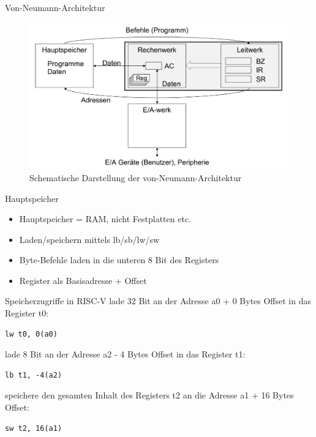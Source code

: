 \documentclass[
  german,            %
  aspectratio=169,    %
]{tumbeamer}
\begin{document}
\begin{frame}[c]{Von-Neumann-Architektur}{}
  \begin{figure}[h]
    \includegraphics[height=0.75\textheight]{resources/w03_von_Neumann.png}
    \caption{Schematische Darstellung der von-Neumann-Architektur}
  \end{figure}
\end{frame}

\begin{frame}[fragile, c]{Hauptspeicher}{}
  \begin{itemize}
    \item Hauptspeicher = RAM, nicht Festplatten etc.
    \item Laden/speichern mittels lb/sb/lw/sw
    \item Byte-Befehle laden in die unteren 8 Bit des Registers
    \item Register als Basisadresse + Offset
  \end{itemize}  
\end{frame}

\begin{frame}[fragile, c]{Speicherzugriffe in RISC-V}{}
  lade 32 Bit an der Adresse a0 + 0 Bytes Offset in das Register t0: 
  \begin{verbatim}lw t0, 0(a0)\end{verbatim}
  lade 8 Bit an der Adresse a2 - 4 Bytes Offset in das Register t1: 
  \begin{verbatim}lb t1, -4(a2)\end{verbatim}
  speichere den gesamten Inhalt des Registers t2 an die Adresse a1 + 16 Bytes Offset:
  \begin{verbatim}sw t2, 16(a1)\end{verbatim}
\end{frame}
\end{document}

